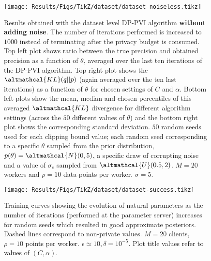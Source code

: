 \begin{figure}
	\texttt{[image: Results/Figs/TikZ/dataset/dataset-noiseless.tikz]}
	\centering
	\caption{\label{fig:results-dataset-noiseless} Results obtained with the dataset level DP-PVI algorithm \textbf{without adding noise}. The number of iterations performed is increased to $1000$ instead of terminating after the privacy budget is consumed. Top left plot shows ratio between the true precision and obtained precision as a function of $\theta$, averaged over the last ten iterations of the DP-PVI algorithm. Top right plot shows the $\altmathcal{KL}(q||p)$ (again averaged over the ten last iterations) as a function of $\theta$ for chosen settings of $C$ and $\alpha$. Bottom left plots show the mean, median and chosen percentiles of this averaged $\altmathcal{KL}$ divergence for different algorithm settings (across the $50$ different values of $\theta$) and the bottom right plot shows the corresponding standard deviation. $50$ random seeds used for each clipping bound value; each random seed corresponding to a specific $\theta$ sampled from the prior distribution, $p(\theta) = \altmathcal{N}(0, 5)$, a specific draw of corrupting noise and a value of $\sigma_e$ sampled from $\altmathcal{U}(0.5, 2)$. $M=20$ workers and $\rho = 10$ data-points per worker. $\sigma=5$. }
\end{figure}

\begin{figure}
	\texttt{[image: Results/Figs/TikZ/dataset/dataset-success.tikz]}
	\centering
	\caption{\label{fig:results-dataset-success} Training curves showing the evolution of natural parameters as the number of iterations (performed at the parameter server) increases for random seeds which resulted in good approximate posteriors. Dashed lines correspond to non-private values. $M=20$ clients, $\rho=10$ points per worker. $\epsilon \simeq 10, \delta = 10^{-5}$. Plot title values refer to values of $(C, \alpha)$. }
\end{figure}

